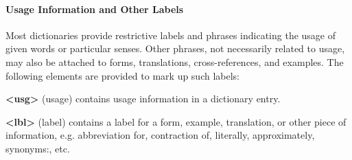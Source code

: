 \paragraph[{Usage Information and Other Labels}]{Usage Information and Other Labels}\label{DITPUS}\par
Most dictionaries provide restrictive labels and phrases indicating the usage of given words or particular senses. Other phrases, not necessarily related to usage, may also be attached to forms, translations, cross-references, and examples. The following elements are provided to mark up such labels:
\begin{sansreflist}
  
\item [\textbf{<usg>}] (usage) contains usage information in a dictionary entry.
\item [\textbf{<lbl>}] (label) contains a label for a form, example, translation, or other piece of information, e.g. abbreviation for, contraction of, literally, approximately, synonyms:, etc.
\end{sansreflist}
